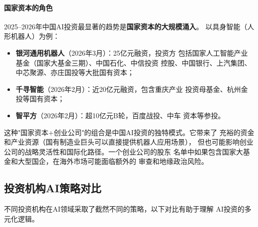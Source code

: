 \paragraph{国家资本的角色}

2025--2026年中国AI投资最显著的趋势是\textbf{国家资本的大规模涌入}。
以具身智能（人形机器人）为例：
\begin{itemize}
  \item \textbf{银河通用机器人}（2026年3月）：25亿元融资，投资方
    包括国家人工智能产业基金（国家大基金三期）、中国石化、中信投资
    控股、中国银行、上汽集团、中芯聚源、亦庄国投等大批国有资本；
  \item \textbf{千寻智能}（2026年2月）：近20亿元融资，包含重庆产业
    投资母基金、杭州金投等国有资本；
  \item \textbf{智平方}（2026年2月）：超10亿元B轮，百度战投、中车
    资本等参投。
\end{itemize}

这种"国家资本+创业公司"的组合是中国AI投资的独特模式。它带来了
充裕的资金和产业资源（国有制造业巨头可以直接提供机器人应用场景），
但也可能影响创业公司的战略灵活性和国际化路径。一个创业公司的股东
名单中如果包含国家大基金和大型国企，在海外市场可能面临额外的
审查和地缘政治风险。

\subsection{投资机构AI策略对比}
\label{subsec:fund-comparison}

不同投资机构在AI领域采取了截然不同的策略，以下对比有助于理解
AI投资的多元化逻辑。

